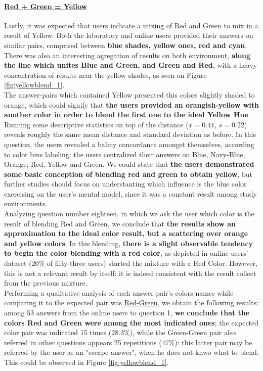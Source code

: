 \paragraph{\ul{Red + Green = Yellow}}
%
Lastly, it was expected that users indicate a mixing of Red and Green to mix in a result of Yellow. Both the laboratory and online users provided their answers on similar pairs, comprised between \textbf{blue shades, yellow ones, red and cyan}. There was also an
interesting agregation of results on both environment, \textbf{along the line which unites Blue and Green, and Green and Red}, with a heavy concentration of results near the yellow shades, as seen on Figure \ref{fig:yellowblend_1}. \\
%
The answer-pairs which contained Yellow presented this colors slightly shaded to orange, which could signify that \textbf{the users provided an orangish-yellow with another color in order to blend the first one to the ideal Yellow Hue}. \\
%
Running some descriptive statistics on top of the distance ($\overline{x} = 0.41$, $s = 0.22$) reveals roughly the same mean distance and standard deviation as before. In this question, the users revealed a balmy concordance amongst themselves, according to color bins
labeling: the users centralized their answers on Blue, Navy-Blue, Orange, Red, Yellow and Green. We could state that \textbf{the users demonstrated some basic conception of blending red and green to obtain yellow}, but further studies should focus on understanting which
influence is the blue color exercising on the user's mental model, since it was a constant result among study environments. \\
%
Analyzing question number eighteen, in which we ask the user which color is the result of blending Red and Green, we conclude that \textbf{the results show an approximation to the ideal color result, but a scattering over orange and yellow colors}.
In this blending, \textbf{there is a slight observable tendency to begin the color blending with a red color}, as depicted in online users' dataset ($20\%$ of fifty-three users) started the mixture with a Red Color. However, this is not a relevant result by itself: it is
indeed consistent with the result collect from the previous mixture. \\
%
Performing a qualitative analysis of each answer pair's colors names while comparing it to the expected pair was
\ul{Red-Green}, we obtain the following results: among 53 answers from the online users to question 1, \textbf{we conclude
that the colors Red and Green were among the most indicated ones}; the expected color pair was indicated 15 times ($28.3\%$),
while the Green-Green pair also referred in other questions appears 25 repetitions ($47\%$): this latter pair may be referred
by the user as an "escape answer", when he does not knwo what to blend. This could be observed in Figure \ref{fig:yellowblend_1}.

